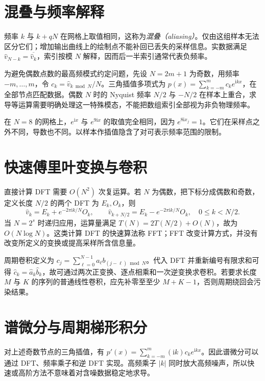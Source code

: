 \documentclass[UTF8,12pt,a4paper,fontset=fandol]{ctexbook}
\begin{document}
\section{混叠与频率解释}
频率 $k$ 与 $k+qN$ 在网格上取值相同，这称为\emph{混叠（aliasing）}。仅由这组样本无法区分它们；增加输出曲线上的绘制点不能补回已丢失的采样信息。实数据满足 $\widehat v_{N-k}=\overline{\widehat v_k}$，索引按模 $N$ 解释，因而后一半索引通常代表负频率。

为避免偶数点数的最高频模式约定问题，先设 $N=2m+1$ 为奇数，用频率 $-m,\ldots,m$，令 $c_k=\widehat v_{k\bmod N}/N$。三角插值多项式为 $p(x)=\sum_{k=-m}^{m}c_ke^{\mathrm i kx}$，在全部节点匹配数据。偶数 $N$ 时的 Nyquist 频率 $N/2$ 与 $-N/2$ 在样本上重合，求导等运算需要明确处理这一特殊模态，不能把数组索引全部视为非负物理频率。

\begin{example}[样本无法识别的两种振荡]
在 $N=8$ 的网格上，$e^{\mathrm i x}$ 与 $e^{9\mathrm i x}$ 的取值完全相同，因为 $e^{8\mathrm i x_j}=1$。它们在采样点之外不同，导数也不同。以样本作插值隐含了对可表示频率范围的限制。
\end{example}

\section{快速傅里叶变换与卷积}
直接计算 DFT 需要 $O(N^2)$ 次复运算。若 $N$ 为偶数，把下标分成偶数和奇数，定义长度 $N/2$ 的两个 DFT 为 $E_k,O_k$，则
\[
 \widehat v_k=E_k+e^{-2\pi\mathrm i k/N}O_k,\qquad
 \widehat v_{k+N/2}=E_k-e^{-2\pi\mathrm i k/N}O_k,
 \quad0\le k<N/2.
\]
当 $N=2^s$ 时递归应用，运算量满足 $T(N)=2T(N/2)+O(N)$，故为 $O(N\log N)$。这类计算 DFT 的快速算法称 FFT；FFT 改变计算方式，并没有改变所定义的变换或提高采样所含信息量。

周期卷积定义为 $c_j=\sum_{\ell=0}^{N-1}a_\ell b_{(j-\ell)\bmod N}$。代入 DFT 并重新编号有限求和可得 $\widehat c_k=\widehat a_k\widehat b_k$，故可通过两次正变换、逐点相乘和一次逆变换求卷积。若要求长度 $M$ 与 $K$ 的序列的普通线性卷积，应先补零至至少 $M+K-1$，否则周期绕回会污染结果。

\section{谱微分与周期梯形积分}
对上述奇数节点的三角插值，有 $p'(x)=\sum_{k=-m}^{m}(\mathrm i k)c_ke^{\mathrm i kx}$。因此谱微分可以通过 DFT、频率乘子和逆 DFT 实现。高频乘子 $|k|$ 同时放大高频噪声，所以快速或高阶方法不意味着对含噪数据稳定地求导。
\end{document}

